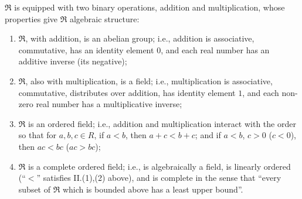 \documentclass{article}
\begin{document}
$\Re$ is equipped with two binary operations, addition and multiplication, whose properties give $\Re$ algebraic structure:
\begin{enumerate}[\hspace{1cm}(1)]
  \item $\Re$, with addition, is an abelian group; i.e., addition is associative, commutative, has an identity element $0$, and each real number has an additive inverse (its negative);
  \item $\Re$, also with multiplication, is a field; i.e., multiplication is associative, commutative, distributes over addition, has identity element $1$, and each non-zero real number has a multiplicative inverse;
  \item $\Re$ is an ordered field; i.e., addition and multiplication interact with the order so that for $a,b,c \in R$, if $a < b$, then $a+c < b+c$; and if $a < b$, $c > 0$ ($c < 0$), then $ac < bc$ ($ac > bc$);
  \item $\Re$ is a complete ordered field; i.e., is algebraically a field, is linearly ordered (``$<$'' satisfies II.(1),(2) above), and is complete in the sense that ``every subset of $\Re$ which is bounded above has a least upper bound''.
\end{enumerate}
\end{document}
